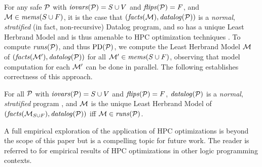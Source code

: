 For any safe $\mathcal{P}$ with $\mathit{iovars}(\mathcal{P}) = S \cup V$ and $\mathit{flips}(\mathcal{P}) = F$, and
$\mathcal{M} \in \mathit{mems}(S \cup F)$, it is the case
that $(\mathit{facts}(\mathcal{M}),\mathit{datalog}(\mathcal{P}))$ is a \emph{normal}, \emph{stratified}
(in fact, non-recursive) Datalog program, and so has a unique Least Herbrand Model
and is thus amenable to HPC optimization techniques \cite{aspis2018linear}. 
To compute $\mathit{runs}(\mathcal{P})$, and thus $\mathrm{PD}(\mathcal{P})$, we compute
the Least Herbrand Model $\mathcal{M}$ of $(\mathit{facts}(\mathcal{M}'),\mathit{datalog}(\mathcal{P}))$
for all $\mathcal{M}' \in \mathit{mems}(S \cup F)$, observing that model computation for
each $\mathcal{M}'$ can be done in parallel. The following establishes
correctness of this approach.
\begin{lemma}
  For all $\mathcal{P}$ with $\mathit{iovars}(\mathcal{P}) = S \cup V$ and $\mathit{flips}(\mathcal{P}) = F$,
  $\mathit{datalog}(\mathcal{P})$ is a \emph{normal}, \emph{stratified}
  program \cite{aspis2018linear}, and $\mathcal{M}$ is the unique Least Herbrand
  Model of $(\mathit{facts}(\mathcal{M}_{S \cup F}),\mathit{datalog}(\mathcal{P}))$
  iff $\mathcal{M} \in \mathit{runs}(\mathcal{P})$.
\end{lemma}
A full empirical exploration of the application of HPC optimizations
is beyond the scope of this paper but is a compelling topic for future
work. The reader is referred to \cite{nguyen2022enhancing} for
empirical results of HPC optimizations in other logic programming
contexts.
